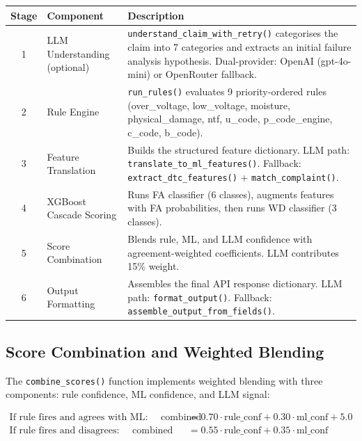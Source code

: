 \documentclass[10pt]{article}
\begin{document}
\begin{table}[h!]
\centering
\begin{tabular}{|c|p{4cm}|p{8cm}|}
\hline
\textbf{Stage} & \textbf{Component} & \textbf{Description} \\ \hline
1 & LLM Understanding (optional) & \texttt{understand\_claim\_with\_retry()} categorises the claim into 7 categories and extracts an initial failure analysis hypothesis. Dual-provider: OpenAI (gpt-4o-mini) or OpenRouter fallback. \\ \hline
2 & Rule Engine & \texttt{run\_rules()} evaluates 9 priority-ordered rules (over\_voltage, low\_voltage, moisture, physical\_damage, ntf, u\_code, p\_code\_engine, c\_code, b\_code). \\ \hline
3 & Feature Translation & Builds the structured feature dictionary. LLM path: \texttt{translate\_to\_ml\_features()}. Fallback: \texttt{extract\_dtc\_features()} + \texttt{match\_complaint()}. \\ \hline
4 & XGBoost Cascade Scoring & Runs FA classifier (6 classes), augments features with FA probabilities, then runs WD classifier (3 classes). \\ \hline
5 & Score Combination & Blends rule, ML, and LLM confidence with agreement-weighted coefficients. LLM contributes 15\% weight. \\ \hline
6 & Output Formatting & Assembles the final API response dictionary. LLM path: \texttt{format\_output()}. Fallback: \texttt{assemble\_output\_from\_fields()}. \\ \hline
\end{tabular}
\end{table}

\subsection{Score Combination and Weighted Blending}

The \texttt{combine\_scores()} function implements weighted blending with three components: rule confidence, ML confidence, and LLM signal:

\begin{align}
\text{If rule fires and agrees with ML: } \quad
\text{combined} &= 0.70 \cdot \text{rule\_conf} + 0.30 \cdot \text{ml\_conf} + 5.0 \\
\text{If rule fires and disagrees: } \quad
\text{combined} &= 0.55 \cdot \text{rule\_conf} + 0.35 \cdot \text{ml\_conf}
\end{align}
\end{document}
